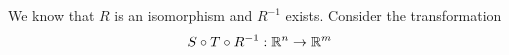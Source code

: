 \documentclass{ximera}
\begin{document}





We know that $R$ is an isomorphism and $R^{-1}$ exists. Consider the transformation
$$S\circ T\circ R^{-1}:\mathbb{R}^n\rightarrow \mathbb{R}^m$$

\end{document}
